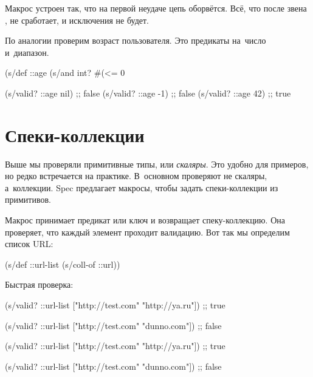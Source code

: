 \fi


Макрос  устроен так, что на первой неудаче цепь оборвётся. Всё, что
после звена , не сработает, и исключения не будет.

По аналогии проверим возраст пользователя. Это предикаты на~число и~диапазон.

\begin{clojure}
(s/def ::age
  (s/and int? #(<= 0 %

(s/valid? ::age nil) ;; false
(s/valid? ::age -1)  ;; false
(s/valid? ::age 42)  ;; true
\end{clojure}

\section{Спеки-коллекции}


Выше мы проверяли примитивные типы, или \emph{скаляры}. Это удобно для примеров,
но редко встречается на практике. В~основном проверяют не скаляры,
а~коллекции. Spec предлагает макросы, чтобы задать спеки-коллекции из
примитивов.


Макрос  принимает предикат или ключ и возвращает
спеку-коллекцию. Она проверяет, что каждый элемент проходит валидацию. Вот так
мы определим список URL:

\begin{clojure}
(s/def ::url-list (s/coll-of ::url))
\end{clojure}

\noindent
Быстрая проверка:

\ifnarrow

\begin{clojure}
(s/valid? ::url-list
  ["http://test.com" "http://ya.ru"])
;; true

(s/valid? ::url-list
  ["http://test.com" "dunno.com"])
;; false
\end{clojure}

\else

\begin{clojure}
(s/valid? ::url-list ["http://test.com" "http://ya.ru"])
;; true

(s/valid? ::url-list ["http://test.com" "dunno.com"])
;; false
\end{clojure}

\fi

